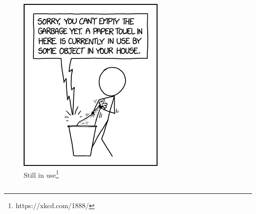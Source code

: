 \documentclass{beamer}
\begin{document}
\begin{frame}
\begin{columns}
        
        \begin{figure}
            \centering
            \includegraphics[width=\textwidth]{still_in_use.png}
            \caption[xkcd_1888]{Still in use\footnote{https://xkcd.com/1888/}} %
        \end{figure}
        
      \end{columns}

\end{frame}
\end{document}
